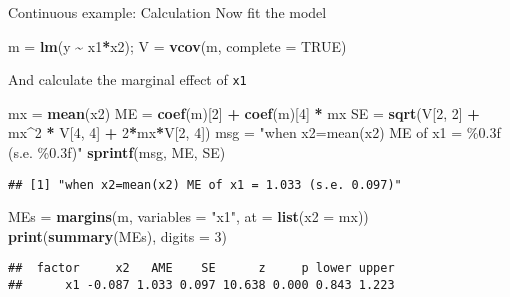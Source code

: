 \documentclass[
  ignorenonframetext,
]{beamer}
\newenvironment{Shaded}{\begin{snugshade}}{\end{snugshade}}
\newcommand{\AttributeTok}[1]{\textcolor[rgb]{0.13,0.29,0.53}{#1}}
\newcommand{\ConstantTok}[1]{\textcolor[rgb]{0.56,0.35,0.01}{#1}}
\newcommand{\DecValTok}[1]{\textcolor[rgb]{0.00,0.00,0.81}{#1}}
\newcommand{\FunctionTok}[1]{\textcolor[rgb]{0.13,0.29,0.53}{\textbf{#1}}}
\newcommand{\NormalTok}[1]{#1}
\newcommand{\OtherTok}[1]{\textcolor[rgb]{0.56,0.35,0.01}{#1}}
\newcommand{\SpecialCharTok}[1]{\textcolor[rgb]{0.81,0.36,0.00}{\textbf{#1}}}
\newcommand{\StringTok}[1]{\textcolor[rgb]{0.31,0.60,0.02}{#1}}
\begin{document}
\begin{frame}[fragile]{Continuous example: Calculation}
\protect\hypertarget{continuous-example-calculation}{}
Now fit the model

\begin{Shaded}
\begin{Highlighting}[]
\NormalTok{m }\OtherTok{=} \FunctionTok{lm}\NormalTok{(y }\SpecialCharTok{\textasciitilde{}}\NormalTok{ x1}\SpecialCharTok{*}\NormalTok{x2); V }\OtherTok{=} \FunctionTok{vcov}\NormalTok{(m, }\AttributeTok{complete =} \ConstantTok{TRUE}\NormalTok{)}
\end{Highlighting}
\end{Shaded}

\pause

And calculate the marginal effect of \texttt{x1}

\begin{Shaded}
\begin{Highlighting}[]
\NormalTok{mx }\OtherTok{=} \FunctionTok{mean}\NormalTok{(x2)}
\NormalTok{ME }\OtherTok{=} \FunctionTok{coef}\NormalTok{(m)[}\DecValTok{2}\NormalTok{] }\SpecialCharTok{+} \FunctionTok{coef}\NormalTok{(m)[}\DecValTok{4}\NormalTok{] }\SpecialCharTok{*}\NormalTok{ mx}
\NormalTok{SE }\OtherTok{=} \FunctionTok{sqrt}\NormalTok{(V[}\DecValTok{2}\NormalTok{, }\DecValTok{2}\NormalTok{] }\SpecialCharTok{+}\NormalTok{ mx}\SpecialCharTok{\^{}}\DecValTok{2} \SpecialCharTok{*}\NormalTok{ V[}\DecValTok{4}\NormalTok{, }\DecValTok{4}\NormalTok{] }\SpecialCharTok{+} \DecValTok{2}\SpecialCharTok{*}\NormalTok{mx}\SpecialCharTok{*}\NormalTok{V[}\DecValTok{2}\NormalTok{, }\DecValTok{4}\NormalTok{])}
\NormalTok{msg }\OtherTok{=} \StringTok{"when x2=mean(x2) ME of x1 = \%0.3f (s.e. \%0.3f)"}
\FunctionTok{sprintf}\NormalTok{(msg, ME, SE)}
\end{Highlighting}
\end{Shaded}

\begin{verbatim}
## [1] "when x2=mean(x2) ME of x1 = 1.033 (s.e. 0.097)"
\end{verbatim}

\begin{Shaded}
\begin{Highlighting}[]
\NormalTok{MEs }\OtherTok{=} \FunctionTok{margins}\NormalTok{(m, }\AttributeTok{variables =} \StringTok{"x1"}\NormalTok{, }\AttributeTok{at =} \FunctionTok{list}\NormalTok{(}\AttributeTok{x2 =}\NormalTok{ mx))}
\FunctionTok{print}\NormalTok{(}\FunctionTok{summary}\NormalTok{(MEs), }\AttributeTok{digits =} \DecValTok{3}\NormalTok{)}
\end{Highlighting}
\end{Shaded}

\begin{verbatim}
##  factor     x2   AME    SE      z     p lower upper
##      x1 -0.087 1.033 0.097 10.638 0.000 0.843 1.223
\end{verbatim}
\end{frame}
\end{document}
